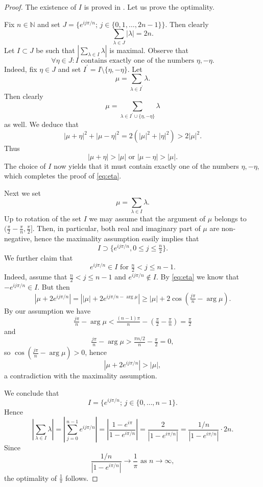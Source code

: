 \documentclass{amsart}
\numberwithin{equation}{section}
\theoremstyle{definition}
\def\en{\mathbb N}
\newcommand{\abs}[1]{\left|#1\right|}
\newcommand{\setsep}{;\,}
\begin{document}
\begin{proof} The existence of $I$ is proved in \cite[Lemma 6.3]{rudin}. Let us prove the optimality.

Fix $n\in\en$ and set $J=\{e^{i j\pi/n}\setsep j\in \{0,1,\dots,2n-1\}\}$. Then clearly
$$\sum_{\lambda\in J} \abs{\lambda}=2n.$$
Let $I\subset J$ be such that $\abs{\sum_{\lambda\in I}\lambda}$ is maximal. Observe that
\begin{equation}
    \label{eq:eta}
\forall \eta\in J\colon I\mbox{ contains exactly one of the numbers }\eta,-\eta.\end{equation}
Indeed, fix $\eta\in J$ and set $I^\prime=I\setminus \{\eta,-\eta\}$.  Let 
$$\mu=\sum_{\lambda\in I^\prime}\lambda.$$
Then clearly
$$\mu=\sum_{\lambda\in I^\prime\cup\{\eta,-\eta\}}\lambda$$
as well. We deduce that
$$\abs{\mu+\eta}^2+\abs{\mu-\eta}^2=2(\abs{\mu}^2+\abs{\eta}^2)>2\abs{\mu}^2.$$
Thus
$$\abs{\mu+\eta}>\abs{\mu}\mbox{ or }\abs{\mu-\eta}>\abs{\mu}.$$
The choice of $I$ now yields that it must contain exactly one of the numbers $\eta,-\eta$, which completes the proof of \eqref{eq:eta}.

Next we set 
$$\mu=\sum_{\lambda\in I} \lambda.$$
Up to rotation of the set $I$ we may assume that the argument of $\mu$ belongs to $(\frac\pi2-\frac\pi n,\frac\pi2]$. Then, in particular, both real and imaginary part of $\mu$ are non-negative, hence the maximality assumption easily implies that
$$I\supset\{e^{i j\pi/n}, 0\le j\le \tfrac n2\}.$$
We further claim that
$$e^{ij\pi/n}\in I\mbox{ for } \tfrac n2<j\le n-1.$$
Indeed, assume that $\frac n2<j\le n-1$ and $e^{ij\pi/n}\notin I$. By \eqref{eq:eta} we know that  $-e^{ij\pi/n}\in I$. But then
$$\abs{\mu+2e^{ij\pi/n}}=\abs{\abs{\mu}+2e^{ij\pi/n-\arg \mu}}\ge \abs{\mu}+2\cos(\tfrac{j\pi}{n}-\arg \mu).$$
By our assumption we have
$$\tfrac{j\pi}{n}-\arg \mu< \tfrac{(n-1)\pi}{n}-(\tfrac\pi2-\tfrac\pi n)=\tfrac\pi2$$
and
$$\tfrac{j\pi}{n}-\arg \mu>\tfrac{\pi n/2}{n}-\tfrac\pi2=0,$$
so $\cos(\tfrac{j\pi}{n}-\arg \mu)>0$, hence
$$\abs{\mu+2e^{ij\pi/n}}>\abs{\mu},$$
a contradiction with the maximality assumption. 

We conclude that
$$I=\{e^{ij\pi/n}\setsep j\in\{0,\dots,n-1\}.$$
Hence
$$\abs{\sum_{\lambda\in I}\lambda}=\abs{\sum_{j=0}^{n-1}e^{ij\pi/n}}=\abs{\frac{1-e^{i\pi}}{1-e^{i\pi/n}}}=\frac{2}{\abs{1-e^{i\pi/n}}}=\frac{1/n}{\abs{1-e^{i\pi/n}}}\cdot 2n.$$
Since
$$\frac{1/n}{\abs{1-e^{i\pi/n}}}\to\frac1\pi\mbox{ as }n\to\infty,$$
the optimality of $\frac1\pi$ follows.
\end{proof}
\end{document}
